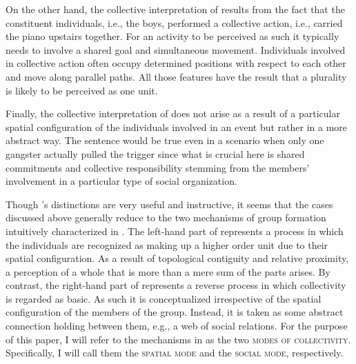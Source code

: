 \documentclass[output=paper]{langscibook}
\begin{document}
On the other hand, the collective interpretation of  results from the fact that the constituent individuals, i.e., the boys, performed a collective action, i.e., carried the piano upstairs together. For an activity to be perceived as such it typically needs to involve a shared goal and simultaneous movement. Individuals involved in collective action often occupy determined positions with respect to each other and move along parallel paths. All those features have the result that a plurality is likely to be perceived as one unit. 

Finally, the collective interpretation of  does not arise as a result of a particular spatial configuration of the individuals involved in an event but rather in a more abstract way. The sentence would be true even in a scenario when only one gangster actually pulled the trigger since what is crucial here is shared commitments and collective responsibility stemming from the members' involvement in a particular type of social organization.

Though \citeauthor{landman2000events}'s distinctions are very useful and instructive, it seems that the cases discussed above generally reduce to the two mechanisms of group formation intuitively characterized in  \citep{zwarts2020contiguity}. The left-hand part of  represents a process in which the individuals are recognized as making up a higher order unit due to their spatial configuration. As a result of topological contiguity and relative proximity, a perception of a whole that is more than a mere sum of the parts arises. By contrast, the right-hand part of  represents a reverse process in which collectivity is regarded as basic. As such it is conceptualized irrespective of the spatial configuration of the members of the group. Instead, it is taken as some abstract connection holding between them, e.g., a web of social relations. For the purpose of this paper, I will refer to the mechanisms in  as the two \textsc{modes of collectivity}. Specifically, I will call them the \textsc{spatial mode} and the \textsc{social mode}, respectively.
\end{document}
